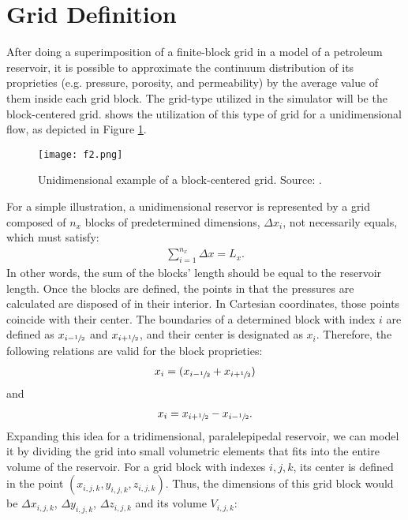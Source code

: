 \section{Grid Definition}
\label{chap:Grid Definition}
After doing a superimposition of a finite-block grid in a model of a petroleum reservoir, it is possible to approximate the continuum distribution of its proprieties (e.g. pressure, porosity, and permeability) by the average value of them inside each grid block. The grid-type utilized in the simulator will be the block-centered grid. \cite{Ertekin2001} shows the utilization of this type of grid for a unidimensional flow, as depicted in Figure \ref{f2}.
\begin{figure}[h]
	\centering
	\texttt{[image: f2.png]}\\
	\caption{Unidimensional example of a block-centered grid. Source: \cite{Ertekin2001}.}
	\label{f2}
\end{figure}
For a simple illustration, a unidimensional reservor is represented by a  grid composed of $n_x$ blocks of predetermined dimensions, $\Delta x_i$, not necessarily equals, which must satisfy:
	\begin{align}
	\label{e2.1}
	\sum_{i=1}^{n_x}\Delta x=L_x.
	\end{align}
In other words, the sum of the blocks' length should be equal to the reservoir length. Once the blocks are defined, the points in that the pressures are calculated are disposed of in their interior. In Cartesian coordinates, those points coincide with their center. The boundaries of a determined block with index $i$ are defined as $x_{i-\sfrac{1}{2}}$ and $x_{i+\sfrac{1}{2}}$, and their center is designated as $x_i$. Therefore, the following relations are valid for the block proprieties:
	\begin{align}
	\label{e2.2}
	x_i= (x_{i-\sfrac{1}{2}} + x_{i+\sfrac{1}{2}})
	\end{align}
	and
	\begin{align}
	\label{e2.3}
	x_i= x_{i+\sfrac{1}{2}} - x_{i-\sfrac{1}{2}}.
	\end{align}
Expanding this idea for a tridimensional, paralelepipedal reservoir, we can model it by dividing the grid into small volumetric elements that fits into the entire volume of the reservoir. For a grid block with indexes $i,j,k$, its center is defined in the point $(x_{i,j,k},y_{i,j,k},z_{i,j,k})$. Thus, the dimensions of this grid block would be $\Delta x_{i,j,k}$, $\Delta y_{i,j,k}$, $\Delta z_{i,j,k}$ and its volume $V_{i,j,k}$:
